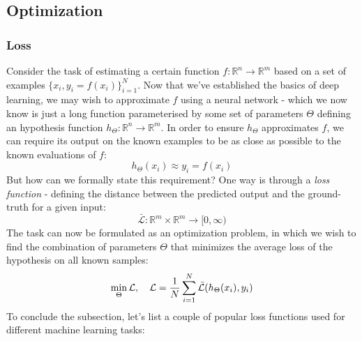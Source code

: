 \documentclass{article}
\begin{document}

\subsection{Optimization}
\label{sec:optimization}

\subsubsection{Loss}
\label{subsec:loss}

Consider the task of estimating a certain function $f: \mathbb{R}^n \rightarrow \mathbb{R}^m$ based on a set of examples $\{x_i, y_i=f(x_i)\}_{i=1}^{N}$. Now that we've established the basics of deep learning, we may wish to approximate $f$ using a neural network - which we now know is just a long function parameterised by some set of parameters $\Theta$ defining an hypothesis function $h_\Theta: \mathbb{R}^n \rightarrow \mathbb{R}^m$. In order to ensure $h_\Theta$ approximates $f$, we can require its output on the known examples to be as close as possible to the known evaluations of $f$:
\begin{equation*}
    h_\Theta(x_i) \approx y_i = f(x_i)
\end{equation*}
But how can we formally state this requirement? One way is through a \emph{loss function} - defining the distance between the predicted output and the ground-truth for a given input:
\begin{equation*}
    \bar{\mathcal{L}}: \mathbb{R}^m \times \mathbb{R}^m \rightarrow [0,\infty)
\end{equation*}
The task can now be formulated as an optimization problem, in which we wish to find the combination of parameters $\Theta$ that minimizes the average loss of the hypothesis on all known samples:
\begin{equation}
    \min_\Theta \mathcal{L}, \quad \mathcal{L} = \frac{1}{N}\sum_{i=1}^{N}{\bar{\mathcal{L}}(h_\Theta(x_i), y_i)} \\
\end{equation}
To conclude the subsection, let's list a couple of popular loss functions used for different machine learning tasks:
\end{document}
